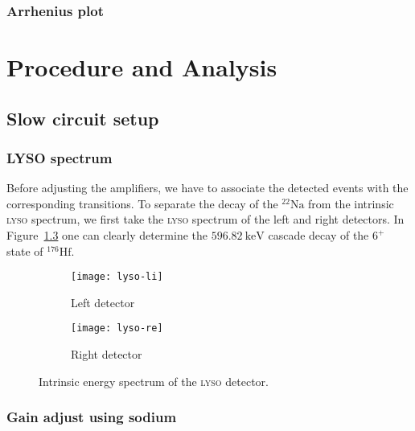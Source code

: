 \documentclass[11pt, english, fleqn, DIV=15, headinclude, BCOR=2cm]{scrreprt}
\begin{document}
\subsection{Arrhenius plot}

\chapter{Procedure and Analysis}

\section{Slow circuit setup}

\subsection{LYSO spectrum}

Before adjusting the amplifiers, we have to associate the detected events with
the corresponding transitions. To separate the decay of the ${}^{22}\text{Na}$
from the intrinsic \textsc{lyso} spectrum, we first take the \textsc{lyso}
spectrum of the left and right detectors. In Figure~\ref{fig:lyso} one can
clearly determine the $\SI{596.82}{\kilo\electronvolt}$ cascade decay of the
$6^+$ state of ${}^{176}\text{Hf}$.

\begin{figure}
        \centering
        \begin{subfigure}[c]{.49\linewidth}
                \centering
                \texttt{[image: lyso-li]}
                \caption{%
                        Left detector
                }
                \label{fig:lyso-li}
        \end{subfigure}
        \hfill
        \begin{subfigure}[c]{.49\linewidth}
                \centering
                \texttt{[image: lyso-re]}
                \caption{%
                        Right detector
                }
                \label{fig:lyso-re}
        \end{subfigure}
        \caption{%
                Intrinsic energy spectrum of the \textsc{lyso} detector.
        }
        \label{fig:lyso}
\end{figure}

\subsection{Gain adjust using sodium}
\end{document}
